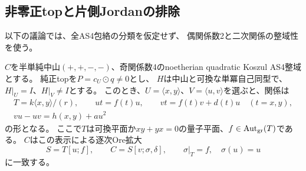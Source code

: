 \subsection{非零正topと片側Jordanの排除}
\label{subsec:h3-order2-22-rank4-Jordan}
以下の議論では、全AS4包絡の分類を仮定せず、
偶関係数2と二次関係の整域性を使う。

\begin{lemma}[正平面を固定する単冪作用の必要表示]
\label{lem:h3-order2-22-rank4-one-sided-form}
$C$を半単純中山$(+,+,-,-)$、奇関係数4のnoetherian quadratic Koszul AS4整域とする。
純正topを$P=c_U\mathbin{\odot}q\ne0$とし、
$H$は中山と可換な単冪自己同型で、$H|_U=I$、$H|_V\ne I$とする。
このとき、$U=\langle x,y\rangle$、$V=\langle u,v\rangle$を選ぶと、関係は
\begin{gather*}
 T=k\langle x,y\rangle/(r),\qquad
 ut=f(t)u,\qquad vt=f(t)v+d(t)u\quad(t=x,y),\\
 vu-uv=h(x,y)+a u^2
\end{gather*}
の形となる。
ここで$T$は可換平面か$xy+yx=0$の量子平面、$f\in\operatorname{Aut}_{\rm gr}(T)$である。
$C$はこの表示による逐次Ore拡大
\[
 S=T[u;f],\qquad C=S[v;\sigma,\delta],\qquad
 \sigma|_T=f,\quad\sigma(u)=u
\]
に一致する。
\end{lemma}
